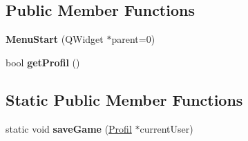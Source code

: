 \subsection*{Public Member Functions}
\begin{DoxyCompactItemize}
\item 
\hypertarget{class_menu_start_a184ff65bb2534378670fee22487b02eb}{}{\bfseries Menu\+Start} (Q\+Widget $\ast$parent=0)\label{class_menu_start_a184ff65bb2534378670fee22487b02eb}

\item 
\hypertarget{class_menu_start_aa472610f5ba9e271cb02159d2ca421cc}{}bool {\bfseries get\+Profil} ()\label{class_menu_start_aa472610f5ba9e271cb02159d2ca421cc}

\end{DoxyCompactItemize}
\subsection*{Static Public Member Functions}
\begin{DoxyCompactItemize}
\item 
\hypertarget{class_menu_start_a7cb6adad5555d8eb90e27bed5e4333c5}{}static void {\bfseries save\+Game} (\hyperlink{class_profil}{Profil} $\ast$current\+User)\label{class_menu_start_a7cb6adad5555d8eb90e27bed5e4333c5}

\end{DoxyCompactItemize}
